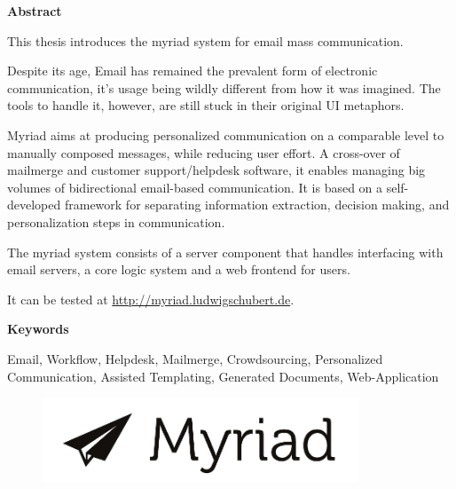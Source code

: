 

\clearemptydoublepage
{}
{}

\vspace*{1cm}
\begin{center}
{\Large \bf Abstract}
\end{center}

This thesis introduces the myriad system for email mass communication.

Despite its age, Email has remained the prevalent form of electronic communication, it's usage being wildly different from how it was imagined. The tools to handle it, however, are still stuck in their original UI metaphors.

Myriad aims at producing personalized communication on a comparable level to manually composed messages, while reducing user effort.
A cross-over of mailmerge and customer support/helpdesk software, it enables managing big volumes of bidirectional email-based communication.
It is based on a self-developed framework for separating information extraction, decision making, and personalization steps in communication.

The myriad system consists of a server component that handles interfacing with email servers, a core logic system and a web frontend for users.

It can be tested at \url{http://myriad.ludwigschubert.de}.

\vspace*{1cm}
\begin{center}
{\Large \bf Keywords}
\end{center}

Email, Workflow, Helpdesk, Mailmerge, Crowdsourcing, Personalized Communication, Assisted Templating, Generated Documents, Web-Application

\vspace*{1cm}

\begin{figure}[h!]
\centering
\includegraphics[height=2.5cm]{figures/myriad-logo.pdf}
\end{figure}